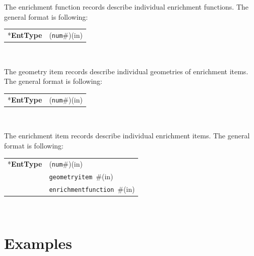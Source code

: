 \documentclass[a4paper]{article}
\makeatletter
\newcommand{\param}[1]{\texttt{#1}} %
\newcommand{\field}[2]{\param{#1}~\#{\tiny(#2)}} %
\newcommand{\componentNum}{(\param{num}\#){\tiny(in)}} %
\newcommand{\entKeyword}[1]{*\textbf{#1}} %
\newenvironment{record}[1][]{\begin{tabular}{|ll}}{\end{tabular}\\}
\newcommand{\recentry}[2]{{#1}&{#2}\\}
\newcounter{rcc}
\newenvironment{record}[1][\textwidth]{\setcounter{rcc}{0}\begin{tabular*}{#1}{|ll@{\extracolsep{\fill}}r}}{\end{tabular*}\\}
\newcommand{\recentry}[2]{\ifthenelse{\value{rcc}>0}{&$\backslash$ \\}{\setcounter{rcc}{1}}{#1}&{#2}}
\makeatother
\begin{document}
The enrichment function records describe individual enrichment functions. The general format is following:\\
\noindent
\begin{record}
  \recentry{\entKeyword{EntType}}{\componentNum}
\end{record}

The geometry item records describe individual geometries of enrichment items. The general format is following:\\
\noindent
\begin{record}
  \recentry{\entKeyword{EntType}}{\componentNum}
\end{record}


The enrichment item records describe individual enrichment items. The general format is following:\\
\noindent
\begin{record}
  \recentry{\entKeyword{EntType}}{\componentNum}
  \recentry{}{\field{geometryitem}{in}}
  \recentry{}{\field{enrichmentfunction}{in}}
\end{record}


\section{Examples}
\end{document}
